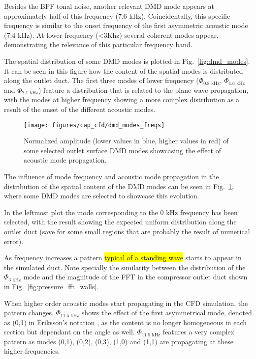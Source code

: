 Besides the BPF tonal noise, another relevant DMD mode appears at approximately half of this frequency (7.6 kHz). Coincidentally, this specific frequency is similar to the onset frequency of the first asymmetric acoustic mode (7.4 kHz). At lower frequency (<3Khz) several coherent modes appear, demonstrating the relevance of this particular frequency band.

The spatial distribution of some DMD modes is plotted in Fig.~\ref{fig:dmd_modes}. It can be seen in this figure how the content of the spatial modes is distributed along the outlet duct. The first three modes of lower frequency ($\Phi_\text{0.8 kHz}$, $\Phi_\text{1.6 kHz}$ and $\Phi_\text{2.1 kHz}$) feature a distribution that is related to the plane wave propagation, with the modes at higher frequency showing a more complex distribution as a result of the onset of the different acoustic modes.
 
\begin{figure}[htb!]
\centering
\texttt{[image: figures/cap\_cfd/dmd\_modes\_freqs]}
\caption{Normalized amplitude (lower values in blue, higher values in red) of some selected outlet surface DMD modes showcasing the effect of acoustic mode propagation.}
\label{fig:dmd_modes_freqs}
\end{figure}

The influence of mode frequency and acoustic mode propagation in the distribution of the spatial content of the DMD modes can be seen in Fig.~\ref{fig:dmd_modes_freqs}, where some DMD modes are selected to showcase this evolution. 

In the leftmost plot the mode corresponding to the 0 kHz frequency has been selected, with the result showing the expected uniform distribution along the outlet duct (save for some small regions that are probably the result of numerical error).

As frequency increases a pattern \hl{typical of a standing wave} starts to appear in the simulated duct. Note specially the similarity between the distribution of the $\Phi_\text{3 kHz}$ mode and the magnitude of the FFT in the compressor outlet duct shown in Fig.~\ref{fig:pressure_fft_walls}. 

When higher order acoustic modes start propagating in the CFD simulation, the pattern changes. $\Phi_\text{11.5 kHz}$ shows the effect of the first asymmetrical mode, denoted as (0,1) in Eriksson's notation \cite{eriksson1980higher}, as the content is no longer homogeneous in each section but dependant on the angle as well. $\Phi_\text{11.5 kHz}$ features a very complex pattern as modes (0,1), (0,2), (0,3), (1,0) and (1,1) are propagating at these higher frequencies.

